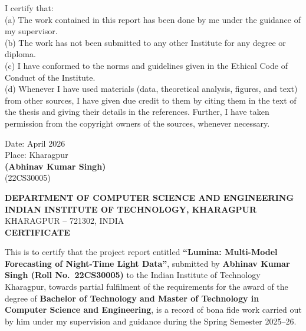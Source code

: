 \documentclass[12pt,a4paper]{report}
\begin{document}
\onehalfspacing
I certify that:\\[0.3cm]
(a) The work contained in this report has been done by me under the guidance of my supervisor.\\[0.3cm]
(b) The work has not been submitted to any other Institute for any degree or diploma.\\[0.3cm]
(c) I have conformed to the norms and guidelines given in the Ethical Code of Conduct of the Institute.\\[0.3cm]
(d) Whenever I have used materials (data, theoretical analysis, figures, and text) from other sources, I have given due credit to them by citing them in the text of the thesis and giving their details in the references. Further, I have taken permission from the copyright owners of the sources, whenever necessary.\\[2cm]

\begin{flushright}
Date: April 2026\\
Place: Kharagpur\\[1.5cm]
\textbf{(Abhinav Kumar Singh)}\\
(22CS30005)
\end{flushright}

\newpage
\thispagestyle{empty}
\begin{center}
    {\Large \textbf{DEPARTMENT OF COMPUTER SCIENCE AND ENGINEERING}}\\[0.5cm]
    {\large \textbf{INDIAN INSTITUTE OF TECHNOLOGY, KHARAGPUR}}\\
    KHARAGPUR -- 721302, INDIA\\[2cm]

    \hypertarget{sec:certificate}{}%
    {\Large \textbf{CERTIFICATE}}\\[1.5cm]
\end{center}

This is to certify that the project report entitled \textbf{``Lumina: Multi-Model Forecasting of Night-Time Light Data''}, submitted by \textbf{Abhinav Kumar Singh (Roll No.\ 22CS30005)} to the Indian Institute of Technology Kharagpur, towards partial fulfilment of the requirements for the award of the degree of \textbf{Bachelor of Technology and Master of Technology in Computer Science and Engineering}, is a record of bona fide work carried out by him under my supervision and guidance during the Spring Semester 2025--26.\\[1.5cm]
\end{document}
